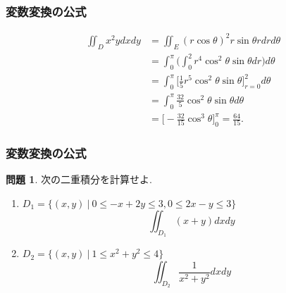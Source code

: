 \documentclass[dvipdfmx,cjk,10.2pt]{beamer}
\theoremstyle{definition}
\newtheorem{Prob}[Thm]{問題}
\begin{document}



\begin{frame}
\frametitle{変数変換の公式}
\begin{align*}
\iint_D x^2y dxdy & = \iint_E (r \cos \theta)^2 r \sin \theta r dr d\theta \\
& = \int_0^\pi \big( \int_0^2 r^4 \cos^2 \theta \sin \theta dr \big) d\theta \\
& = \int_0^\pi \big[ \frac{1}{5}r^5 \cos^2 \theta \sin \theta \big]_{r=0}^2 d\theta \\
& = \int_0^\pi \frac{32}{5} \cos^2 \theta \sin \theta d\theta \\
& = \big[-\frac{32}{15} \cos^3 \theta\big]_0^\pi = \frac{64}{15}. 
\end{align*}

\end{frame}




\begin{frame}
\frametitle{変数変換の公式}


\begin{Prob}
次の二重積分を計算せよ. 
\begin{enumerate}
\item $D_1=\{(x,y) \ | \ 0 \le -x+2y \le 3, 0 \le 2x-y \le 3\}$
$$\iint_{D_1} (x+y) dxdy$$
\item $D_2=\{(x,y) \ | \  1 \le x^2+y^2 \le 4\}$
$$
\iint_{D_2} \frac{1}{x^2+y^2}dxdy
$$
\end{enumerate}
\end{Prob}

\end{frame}



\end{document}
